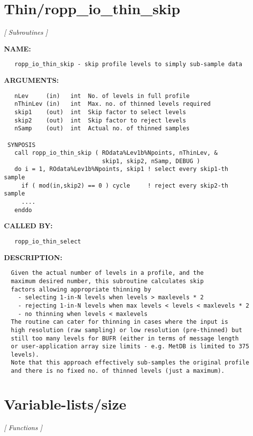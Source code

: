 \section{Thin/ropp\_io\_thin\_skip}
\textsl{[ Subroutines ]}

\label{ch:robo111}
\label{ch:Thin_ropp_io_thin_skip}
\textbf{NAME:}\hspace{0.08in}\begin{Verbatim}
   ropp_io_thin_skip - skip profile levels to simply sub-sample data
\end{Verbatim}
\textbf{ARGUMENTS:}\hspace{0.08in}\begin{Verbatim}
   nLev     (in)   int  No. of levels in full profile
   nThinLev (in)   int  Max. no. of thinned levels required
   skip1    (out)  int  Skip factor to select levels
   skip2    (out)  int  Skip factor to reject levels
   nSamp    (out)  int  Actual no. of thinned samples

 SYNPOSIS
   call ropp_io_thin_skip ( ROdata%Lev1b%Npoints, nThinLev, &
                            skip1, skip2, nSamp, DEBUG )
   do i = 1, ROdata%Lev1b%Npoints, skip1 ! select every skip1-th sample
     if ( mod(in,skip2) == 0 ) cycle     ! reject every skip2-th sample
     ....
   enddo
\end{Verbatim}
\textbf{CALLED BY:}\hspace{0.08in}\begin{Verbatim}
   ropp_io_thin_select
\end{Verbatim}
\textbf{DESCRIPTION:}\hspace{0.08in}\begin{Verbatim}
  Given the actual number of levels in a profile, and the
  maximum desired number, this subroutine calculates skip
  factors allowing appropriate thinning by
    - selecting 1-in-N levels when levels > maxlevels * 2
    - rejecting 1-in-N levels when max levels < levels < maxlevels * 2
    - no thinning when levels < maxlevels
  The routine can cater for thinning in cases where the input is
  high resolution (raw sampling) or low resolution (pre-thinned) but
  still too many levels for BUFR (either in terms of message length
  or user-application array size limits - e.g. MetDB is limited to 375
  levels).
  Note that this approach effectively sub-samples the original profile
  and there is no fixed no. of thinned levels (just a maximum).
\end{Verbatim}
\section{Variable-lists/size}
\textsl{[ Functions ]}

